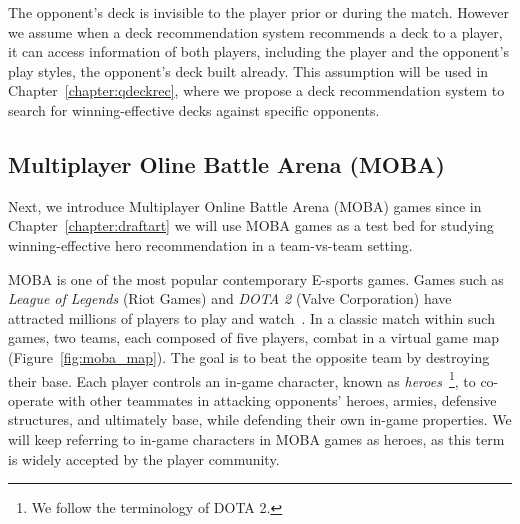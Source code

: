 
The opponent's deck is invisible to the player prior or during the match. However we assume when a deck recommendation system recommends a deck to a player, it can access information of both players, including the player and the opponent's play styles, the opponent's deck built already. This assumption will be used in Chapter~\ref{chapter:qdeckrec}, where we propose a deck recommendation system to search for winning-effective decks against specific opponents. 


\subsection{Multiplayer Oline Battle Arena (MOBA)}\label{sec:background_moba}
Next, we introduce Multiplayer Online Battle Arena (MOBA) games since in Chapter~\ref{chapter:draftart} we will use MOBA games as a test bed for studying winning-effective hero recommendation in a team-vs-team setting.


MOBA is one of the most popular contemporary E-sports games. Games such as \textit{League of Legends} (Riot Games) and \textit{DOTA 2} (Valve Corporation) have attracted millions of players to play and watch~\citep{lol_fanbase,lol_27million}. In a classic match within such games, two teams, each composed of five players, combat in a virtual game map (Figure~\ref{fig:moba_map}). The goal is to beat the opposite team by destroying their base. Each player controls an in-game character, known as \textit{heroes}~\footnote{We follow the terminology of DOTA 2.}, to co-operate with other teammates in attacking opponents' heroes, armies, defensive structures, and ultimately base, while defending their own in-game properties. We will keep referring to in-game characters in MOBA games as heroes, as this term is widely accepted by the player community. 

